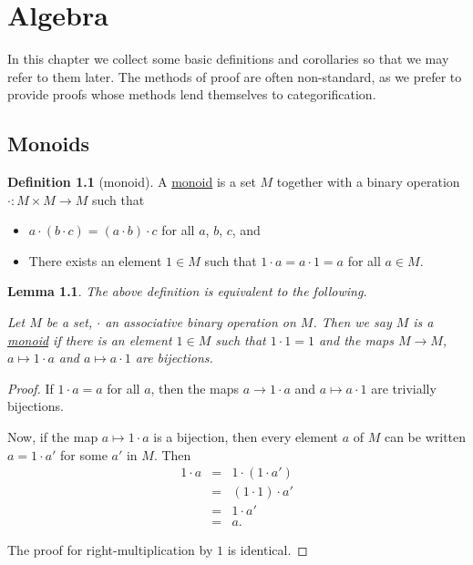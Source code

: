 \documentclass[a4paper,10pt]{scrreprt}
\newcommand{\defn}[1]{\ul{#1}}
\theoremstyle{definition}
\newtheorem{definition}{Definition}[section]
\theoremstyle{plain}
\newtheorem{lemma}{Lemma}[section]
\theoremstyle{remark}
\begin{document}
\chapter{Algebra}

In this chapter we collect some basic definitions and corollaries so that we may refer to them later. The methods of proof are often non-standard, as we prefer to provide proofs whose methods lend themselves to categorification.
\section{Monoids}
\begin{definition}[monoid]
  \label{def:monoid}
  A \defn{monoid} is a set $M$ together with a binary operation $\cdot\colon M \times M \to M$ such that
  \begin{itemize}
    \item $a \cdot (b \cdot c)=(a \cdot b) \cdot c$ for all $a$, $b$, $c$, and
    \item There exists an element $1 \in M$ such that $1 \cdot a=a \cdot 1=a$ for all $a \in M$.
  \end{itemize}
\end{definition}

\begin{lemma}
  \label{lemma:monoidalmultiplicationbyunitbijective}
  The above definition is equivalent to the following.

  Let $M$ be a set, $\cdot$ an associative binary operation on $M$. Then we say $M$ is a \defn{monoid} if there is an element $1 \in M$ such that $1\cdot 1 = 1$ and the maps $M \to M$, $a \mapsto 1 \cdot a$ and $ a \mapsto a \cdot 1$ are bijections.
\end{lemma}
\begin{proof}
  If $1 \cdot a = a$ for all $a$, then the maps $a \to 1\cdot a$ and $a \mapsto a \cdot 1$ are trivially bijections.

  Now, if the map $a \mapsto 1 \cdot a$ is a bijection, then every element $a$ of $M$ can be written $a = 1 \cdot a'$ for some $a'$ in $M$. Then
  \begin{eqnarray*}
    1 \cdot a &=& 1 \cdot (1 \cdot a') \\
    &=& (1 \cdot 1) \cdot a' \\
    &=& 1 \cdot a' \\
    &=& a.
  \end{eqnarray*}

  The proof for right-multiplication by $1$ is identical.
\end{proof}
\end{document}
